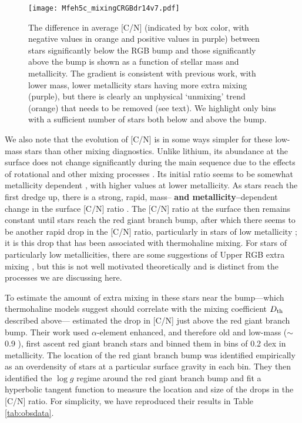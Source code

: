 \begin{figure}[!tb]
\begin{center}
\texttt{[image: Mfeh5c\_mixingCRGBdr14v7.pdf]}%
\caption{
The difference in average [C/N] (indicated by box color, with negative values in orange and positive values in purple) between stars significantly below the RGB bump and those significantly above the bump is shown as a function of stellar mass and metallicity. The gradient is consistent with previous work, with lower mass, lower metallicity stars having more extra mixing (purple), but there is clearly an unphysical `unmixing' trend (orange) that needs to be removed (see text). We highlight only bins with a sufficient number of stars both below and above the bump. }
\label{fig:obssquare}
\end{center}
\end{figure}




We also note that the evolution of [C/N] is in some ways simpler for these low-mass stars than other mixing diagnostics. Unlike lithium, its abundance at the surface does not change significantly during the main sequence due to the effects of rotational and other mixing processes \citep{Iben1967}. Its initial ratio seems to be somewhat metallicity dependent \citep{Shetrone2019}, with higher values at lower metallicity. As stars reach the first dredge up, there is a strong, rapid, mass--\textbf{ and metallicity--}dependent change in the surface [C/N] ratio \citep{Salaris2015, MasseronGilmore2015, Martig2016, Ness2016, Spoo2022}. The [C/N] ratio at the surface then remains constant until stars reach the red giant branch bump, after which there seems to be another rapid drop in the [C/N] ratio, particularly in stars of low metallicity \citep[e.g.][]{Gratton2000,Shetrone2019}; it is this drop that has been associated with thermohaline mixing.  For stars of particularly low metallicities, there are some suggestions of Upper RGB extra mixing \citep{Shetrone2019}, but this is not well motivated theoretically and is distinct from the processes we are discussing here.

To estimate the amount of extra mixing in these stars near the bump---which thermohaline models suggest should correlate with the mixing coefficient $D_\mathrm{th}$ described above---\citet{Shetrone2019} estimated the drop in [C/N] just above the red giant branch bump. Their work used $\alpha$-element enhanced, and therefore old and low-mass ($\sim$0.9 \msun), first ascent red giant branch stars and binned them in bins of 0.2 dex in metallicity. The location of the red giant branch bump was identified empirically as an overdensity of stars at a particular surface gravity in each bin. They then identified the $\log g$ regime around the red giant branch bump and fit a hyperbolic tangent function to measure the location and size of the drops in the [C/N] ratio. For simplicity, we have reproduced their results in Table \ref{tab:obsdata}. 

